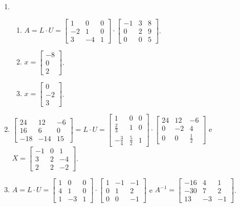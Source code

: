 \documentclass[12pt,a4paper]{article}
\begin{document}
\begin{enumerate}
\item
\begin{enumerate}
\item $A = L \cdot U =
\begin{bmatrix}
 1 &  0 & 0 \\
-2 &  1 & 0 \\
 3 & -4 & 1
\end{bmatrix}
\cdot
\begin{bmatrix}
-1 & 3 & 8 \\
 0 & 2 & 9 \\
 0 & 0 & 5
\end{bmatrix}
$.

\item
$ x = \begin{bmatrix}
-8 \\ 0 \\ 2
\end{bmatrix}$.
\item
$ x = \begin{bmatrix}
0 \\ -2 \\ 3
\end{bmatrix}$.
\end{enumerate}

\item $\begin{bmatrix}
 24 &  12 & -6\\
 16 &   6 &  0\\
-18 & -14 & 15
\end{bmatrix}
=L \cdot U =
\begin{bmatrix}
1&0&0\\
\frac{2}{3}&1&0\\
-\frac{3}{4}&\frac{5}{2}&1
\end{bmatrix}
\cdot
\begin{bmatrix}
24&12&-6\\
0&-2&4\\
0&0&\frac{1}{2}
\end{bmatrix}$
e
$X = \begin{bmatrix}
-1&0&1\\
3&2&-4\\
2&2&-2
\end{bmatrix}$.

\item $A = L \cdot U =
\begin{bmatrix}
1&0&0\\4&1&0\\1&-3&1
\end{bmatrix}
\cdot
\begin{bmatrix}
1&-1&-1\\0&1&2\\0&0&-1
\end{bmatrix}$
e
$A^{-1} = \begin{bmatrix}
-16&4&1\\
-30&7&2\\
13&-3&-1
\end{bmatrix}$.


\end{enumerate}
\end{document}
